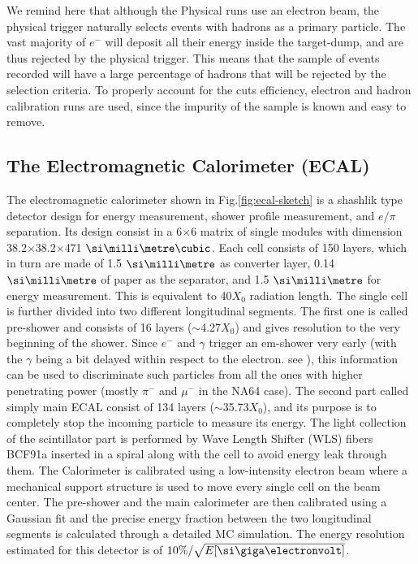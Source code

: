 We remind here that although the Physical runs use an electron beam, the physical trigger naturally selects events with hadrons as a primary particle. The vast majority of $e^-$ will deposit all their energy inside the target-dump, and are thus rejected by the physical trigger. This means that the sample of events recorded will have a large percentage of hadrons that will be rejected by the selection criteria. To properly account for the cuts efficiency, electron and hadron calibration runs are used, since the impurity of the sample is known and easy to remove.

\subsection{The Electromagnetic Calorimeter (ECAL)}
\label{ch2:sec:detectors-ecal}

The electromagnetic calorimeter shown in Fig.\ref{fig:ecal-sketch} is a shashlik type detector design for energy measurement, shower profile measurement, and $e/\pi$ separation. Its design consist in a 6$\times$6 matrix of single modules with dimension 38.2$\times$38.2$\times$471 $\mmc$. Each cell consists of 150 layers, which in turn are made of 1.5 $\mmi$ as converter layer, 0.14 $\mmi$ of paper as the separator, and 1.5 $\mmi$ for energy measurement. This is equivalent to 40$X_0$ radiation length. The single cell is further divided into two different longitudinal segments. The first one is called pre-shower and consists of 16 layers ($\sim$4.27$X_0$) and gives resolution to the very beginning of the shower. Since $e^-$ and $\gamma$ trigger an em-shower very early (with the $\gamma$ being a bit delayed within respect to the electron. see \cite{Bichsel:2002cf}), this information can be used to discriminate such particles from all the ones with higher penetrating power (mostly $\pi^-$ and $\mu^-$ in the NA64 case). The second part called simply main ECAL consist of 134 layers ($\sim$35.73$X_0$), and its purpose is to completely stop the incoming particle to measure its energy. The light collection of the scintillator part is performed by Wave Length Shifter (WLS) fibers BCF91a \cite{wls-fibers} inserted in a spiral along with the cell to avoid energy leak through them. The Calorimeter is calibrated using a low-intensity electron beam where a mechanical support structure is used to move every single cell on the beam center. The pre-shower and the main calorimeter are then calibrated using a Gaussian fit and the precise energy fraction between the two longitudinal segments is calculated through a detailed MC simulation. The energy resolution estimated for this detector is of $10\% / \sqrt{E[\gev]}$.

